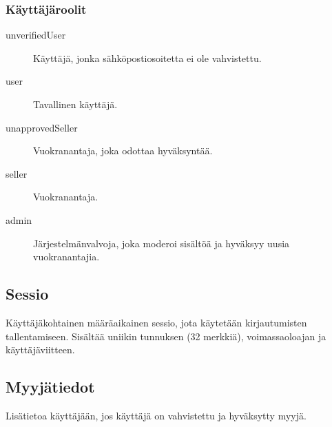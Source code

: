 \subsubsection*{Käyttäjäroolit}
\begin{description}
	\item[unverifiedUser] Käyttäjä, jonka sähköpostiosoitetta ei ole vahvistettu.
	\item[user] Tavallinen käyttäjä.
	\item[unapprovedSeller] Vuokranantaja, joka odottaa hyväksyntää.
	\item[seller] Vuokranantaja.
	\item[admin] Järjestelmänvalvoja, joka moderoi sisältöä ja hyväksyy uusia vuokranantajia. 
\end{description}

\subsection{Sessio}
Käyttäjäkohtainen määräaikainen sessio, jota käytetään kirjautumisten tallentamiseen. Sisältää uniikin tunnuksen (32 merkkiä), voimassaoloajan ja käyttäjäviitteen.

\subsection{Myyjätiedot}
Lisätietoa käyttäjään, jos käyttäjä on vahvistettu ja hyväksytty myyjä.

